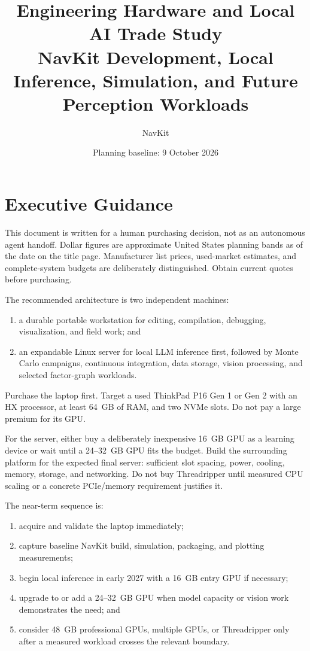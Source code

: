 \documentclass[11pt]{article}
\title{Engineering Hardware and Local AI Trade Study\\
\large NavKit Development, Local Inference, Simulation, and Future Perception Workloads}
\author{NavKit}
\date{Planning baseline: 9 October 2026}
\begin{document}
\hypersetup{pageanchor=false}
\maketitle
\hypersetup{pageanchor=true}
\tableofcontents
\clearpage

\section{Executive Guidance}

\begin{scopebox}
This document is written for a human purchasing decision, not as an autonomous
agent handoff. Dollar figures are approximate United States planning bands as
of the date on the title page. Manufacturer list prices, used-market estimates,
and complete-system budgets are deliberately distinguished. Obtain current
quotes before purchasing.
\end{scopebox}

The recommended architecture is two independent machines:

\begin{enumerate}
  \item a durable portable workstation for editing, compilation, debugging,
        visualization, and field work; and
  \item an expandable Linux server for local LLM inference first, followed by
        Monte Carlo campaigns, continuous integration, data storage, vision
        processing, and selected factor-graph workloads.
\end{enumerate}

\begin{decisionbox}
Purchase the laptop first. Target a used ThinkPad P16 Gen 1 or Gen 2 with an HX
processor, at least 64~GB of RAM, and two NVMe slots. Do not pay a large premium
for its GPU.

For the server, either buy a deliberately inexpensive 16~GB GPU as a learning
device or wait until a 24--32~GB GPU fits the budget. Build the surrounding
platform for the expected final server: sufficient slot spacing, power,
cooling, memory, storage, and networking. Do not buy Threadripper until measured
CPU scaling or a concrete PCIe/memory requirement justifies it.
\end{decisionbox}

The near-term sequence is:

\begin{enumerate}
  \item acquire and validate the laptop immediately;
  \item capture baseline NavKit build, simulation, packaging, and plotting
        measurements;
  \item begin local inference in early 2027 with a 16~GB entry GPU if necessary;
  \item upgrade to or add a 24--32~GB GPU when model capacity or vision work
        demonstrates the need; and
  \item consider 48~GB professional GPUs, multiple GPUs, or Threadripper only
        after a measured workload crosses the relevant boundary.
\end{enumerate}
\end{document}
